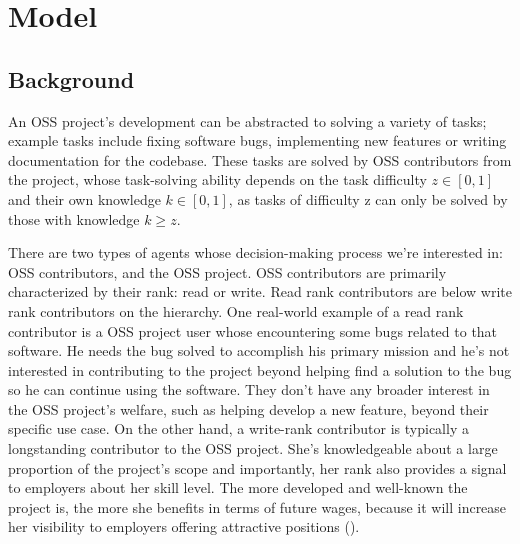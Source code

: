 \documentclass[12pt,notitlepage]{article}
\begin{document}
\section{Model}
\subsection{Background}
An OSS project's development can be abstracted to solving a variety of tasks; example tasks include fixing software bugs, implementing new features or writing documentation for the codebase. These tasks are solved by OSS contributors from the project, whose task-solving ability depends on the task difficulty $z \in [0, 1]$ and their own knowledge $k \in [0, 1]$, as tasks of difficulty z can only be solved by those with knowledge $k \geq z$. 

\qquad There are two types of agents whose decision-making process we're interested in: OSS contributors, and the OSS project. OSS contributors are primarily characterized by their rank: read or write. Read rank contributors are below write rank contributors on the hierarchy.  One real-world example of a read rank contributor is a OSS project user whose encountering some bugs related to that software. He needs the bug solved to accomplish his primary mission and he's not interested in contributing to the project beyond helping find a solution to the bug so he can continue using the software. They don't have any broader interest in the OSS project's welfare, such as helping develop a new feature, beyond their specific use case. On the other hand, a write-rank contributor is typically a longstanding contributor to the OSS project. She's knowledgeable about a large proportion of the project's scope and importantly, her rank also provides a signal to employers about her skill level. The more developed and well-known the project is, the more she benefits in terms of future wages, because it will increase her visibility to employers offering attractive positions (\cite{hann_economic_2002}). 
\end{document}
